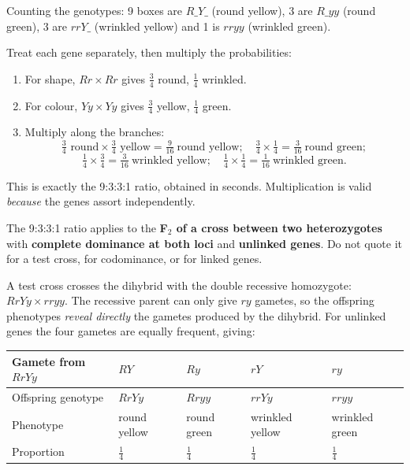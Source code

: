 \documentclass[11pt]{article}
\newcommand{\cle}[1]{{\popxbold\color{popdark}#1}}
\newcounter{popsec}
\newcounter{popsub}
\newcommand{\courssub}[1]{%
  \stepcounter{popsub}%
  \par\vspace{9pt}\noindent{\popxbold\fontsize{11.5}{13}\selectfont\color{popink}{\color{poporange}\thepopsec.\thepopsub}\hspace{6pt}#1}\par\nopagebreak\vspace{4pt}
}
\begin{document}
Counting the genotypes: 9 boxes are $R\_Y\_$ (round yellow), 3 are $R\_yy$ (round green), 3 are $rrY\_$ (wrinkled yellow) and 1 is $rryy$ (wrinkled green).

\begin{methode}
Treat each gene separately, then multiply the probabilities:
\begin{enumerate}
\item For shape, $Rr \times Rr$ gives $\tfrac{3}{4}$ round, $\tfrac{1}{4}$ wrinkled.
\item For colour, $Yy \times Yy$ gives $\tfrac{3}{4}$ yellow, $\tfrac{1}{4}$ green.
\item Multiply along the branches:
\[ \tfrac{3}{4}\text{ round} \times \tfrac{3}{4}\text{ yellow} = \tfrac{9}{16}\ \text{round yellow};\quad \tfrac{3}{4}\times\tfrac{1}{4} = \tfrac{3}{16}\ \text{round green}; \]
\[ \tfrac{1}{4}\times\tfrac{3}{4} = \tfrac{3}{16}\ \text{wrinkled yellow};\quad \tfrac{1}{4}\times\tfrac{1}{4} = \tfrac{1}{16}\ \text{wrinkled green}. \]
\end{enumerate}
This is exactly the 9:3:3:1 ratio, obtained in seconds. Multiplication is valid \emph{because} the genes assort independently.
\end{methode}

\begin{attention}
The 9:3:3:1 ratio applies to the \textbf{F$_2$ of a cross between two heterozygotes} with \textbf{complete dominance at both loci} and \textbf{unlinked genes}. Do not quote it for a test cross, for codominance, or for linked genes.
\end{attention}

\courssub{The Dihybrid Test Cross}

A \cle{test cross} crosses the dihybrid with the double recessive homozygote: $RrYy \times rryy$. The recessive parent can only give $ry$ gametes, so the offspring phenotypes \emph{reveal directly} the gametes produced by the dihybrid. For unlinked genes the four gametes are equally frequent, giving:

\begin{center}
\begin{tabularx}{\linewidth}{|l|X|X|X|X|}
\hline
\rowcolor{popblueL} \textbf{Gamete from $RrYy$} & $RY$ & $Ry$ & $rY$ & $ry$ \\
\hline
Offspring genotype & $RrYy$ & $Rryy$ & $rrYy$ & $rryy$ \\
\hline
Phenotype & round yellow & round green & wrinkled yellow & wrinkled green \\
\hline
Proportion & $\tfrac{1}{4}$ & $\tfrac{1}{4}$ & $\tfrac{1}{4}$ & $\tfrac{1}{4}$ \\
\hline
\end{tabularx}
\end{center}
\end{document}
